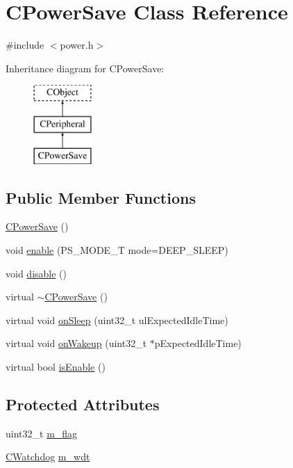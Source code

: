 \hypertarget{class_c_power_save}{\section{C\-Power\-Save Class Reference}
\label{class_c_power_save}
}


{\ttfamily \#include $<$power.\-h$>$}

Inheritance diagram for C\-Power\-Save\-:\begin{figure}[H]
\begin{center}
\leavevmode
\includegraphics[height=3.000000cm]{d5/d3e/class_c_power_save}
\end{center}
\end{figure}
\subsection*{Public Member Functions}
\begin{DoxyCompactItemize}
\item 
\hyperlink{class_c_power_save_a85df3a4f0a12d27e4be3fab19f3af7c5}{C\-Power\-Save} ()
\item 
void \hyperlink{class_c_power_save_a47741a6376b9b3065422d37d49851f25}{enable} (P\-S\-\_\-\-M\-O\-D\-E\-\_\-\-T mode=D\-E\-E\-P\-\_\-\-S\-L\-E\-E\-P)
\item 
void \hyperlink{class_c_power_save_a4311f52789a5e20f2a37ebddb1228e36}{disable} ()
\item 
virtual \hyperlink{class_c_power_save_a12d61ab67891276ca392e73db47f6b55}{$\sim$\-C\-Power\-Save} ()
\item 
virtual void \hyperlink{class_c_power_save_a646cda9a3b424a1cb4e1dbf5b9d4870f}{on\-Sleep} (uint32\-\_\-t ul\-Expected\-Idle\-Time)
\item 
virtual void \hyperlink{class_c_power_save_a3c0304fe662448a763f8addb03a0f342}{on\-Wakeup} (uint32\-\_\-t $\ast$p\-Expected\-Idle\-Time)
\item 
virtual bool \hyperlink{class_c_power_save_ae7f5e81053c530c03deef192c10f93d5}{is\-Enable} ()
\end{DoxyCompactItemize}
\subsection*{Protected Attributes}
\begin{DoxyCompactItemize}
\item 
uint32\-\_\-t \hyperlink{class_c_power_save_a3095ad5f6ba5d06364df1fd8304147ba}{m\-\_\-flag}
\item 
\hyperlink{class_c_watchdog}{C\-Watchdog} \hyperlink{class_c_power_save_afac4eec3245ca0555adb81ad15dad2a0}{m\-\_\-wdt}
\end{DoxyCompactItemize}


